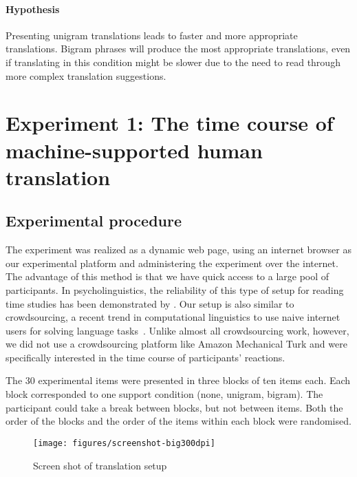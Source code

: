 \documentclass[output=paper]{LSP/langsci}
\begin{document}
\paragraph*{Hypothesis} 
Presenting
unigram translations leads to faster and more appropriate
translations. Bigram phrases will produce the most appropriate
translations, even if translating in this condition might be slower
due to the need to read through more complex translation suggestions.






\section{Experiment 1: The time course of machine-supported human translation}
\label{sec:kremer:exp-ts}

\subsection{Experimental procedure}

The experiment was realized as a dynamic web page, using an internet
browser as our experimental platform and administering the experiment
over the internet. The advantage of this method is that we have quick
access to a large pool of participants. In psycholinguistics, the
reliability of this type of setup for reading time studies has been
demonstrated by \cite{keller09:_timin_accur_of_web_exper}.  Our setup
is also similar to crowdsourcing, a recent trend in computational
linguistics to use naive internet users for solving language
tasks~\citep{snow-EtAl:2008:EMNLP,
  mohammad11:_crowd_word_emotion_assoc_lexic}. Unlike almost all
crowdsourcing work, however, we did not use a crowdsourcing platform
like Amazon Mechanical Turk and were specifically interested in the
time course of participants' reactions.

The 30 experimental items were presented in three blocks of ten
items each. Each block corresponded to one support condition (none,
unigram, bigram). The participant could take a break between blocks,
but not between items. Both the order of the blocks and the order of
the items within each block were randomised.

\begin{figure}%
  \centering
  \texttt{[image: figures/screenshot-big300dpi]}
  \caption{Screen shot of translation setup}
  \label{fig:screen-trans}
\end{figure}
\end{document}
